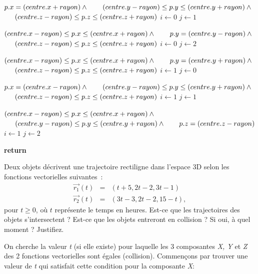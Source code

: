 \documentclass[12pt,addpoints]{exam}
\begin{document}
\begin{questions}
\begin{solution}
\begin{algorithmic}
	\If
	{
		$p.x = (centre.x + rayon) \land \newline$
		$\indent (centre.y - rayon) \leq p.y \leq (centre.y + rayon) \land \newline$
		$\indent (centre.z - rayon) \leq p.z \leq (centre.z + rayon)$
	}
		\State $i \gets 0$
		\State $j \gets 1$
	\EndIf

	\If 
	{
		$(centre.x - rayon) \leq p.x \leq (centre.x + rayon) \land \newline$
		$\indent p.y = (centre.y - rayon) \land \newline$
		$\indent (centre.z - rayon) \leq p.z \leq (centre.z + rayon)$
	}
		\State $i \gets 0$
		\State $j \gets 2$
	\EndIf

	\If 
	{
		$(centre.x - rayon) \leq p.x \leq (centre.x + rayon) \land \newline$
		$\indent p.y = (centre.y + rayon) \land \newline$
		$\indent (centre.z - rayon) \leq p.z \leq (centre.z + rayon)$
	}
		\State $i \gets 1$
		\State $j \gets 0$
	\EndIf

	\If 
	{
		$p.x = (centre.x - rayon) \land \newline$
		$\indent (centre.y - rayon) \leq p.y \leq (centre.y + rayon) \land \newline$
		$\indent (centre.z - rayon) \leq p.z \leq (centre.z + rayon)$
	}
		\State $i \gets 1$
		\State $j \gets 1$
	\EndIf

	\If 
	{
		$(centre.x - rayon) \leq p.x \leq (centre.x + rayon) \land \newline$
		$\indent (centre.y - rayon) \leq p.y \leq (centre.y + rayon) \land \newline$
		$\indent p.z = (centre.z - rayon)$
	}
		\State $i \gets 1$
		\State $j \gets 2$
	\EndIf

	\State \textbf{return} 
	\EndFunction
	\end{algorithmic}
\end{solution}

\question[15]
Deux objets décrivent une trajectoire rectiligne dans l'espace 3D selon les fonctions vectorielles suivantes~:
\begin{eqnarray*}
  \vec{r_1}(t) & = & (t + 5, 2t - 2, 3t - 1) \\
  \vec{r_2}(t) & = & (3t - 3, 2t - 2, 15 - t),
\end{eqnarray*}
pour $t \geq 0$, où $t$ représente le temps en heures. Est-ce que les trajectoires des objets s'intersectent ? Est-ce que les objets entreront en collision ? Si oui, à quel moment ? Justifiez.
\begin{solution}
On cherche la valeur \emph{t} (si elle existe) pour laquelle les 3 composantes \emph{X, Y} et \emph{Z} des 2 fonctions vectorielles sont égales (collision). Commençons par trouver une valeur de \emph{t} qui satisfait cette condition pour la composante \emph{X}:


\end{solution}
\end{questions}
\end{document}
